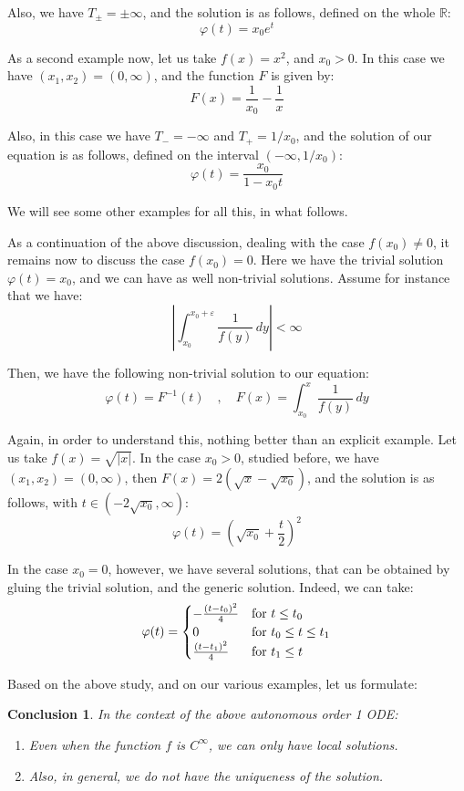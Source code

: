 \documentclass[12pt]{amsbook}
\newtheorem{conclusion}[theorem]{Conclusion}
\begin{document}
Also, we have $T_\pm=\pm\infty$, and the solution is as follows, defined on the whole $\mathbb R$:
$$\varphi(t)=x_0e^t$$

As a second example now, let us take $f(x)=x^2$, and $x_0>0$. In this case we have $(x_1,x_2)=(0,\infty)$, and the function $F$ is given by:
$$F(x)=\frac{1}{x_0}-\frac{1}{x}$$

Also, in this case we have $T_-=-\infty$ and $T_+=1/x_0$, and the solution of our equation is as follows, defined on the interval $(-\infty,1/x_0)$:
$$\varphi(t)=\frac{x_0}{1-x_0t}$$

We will see some other examples for all this, in what follows.

\bigskip

As a continuation of the above discussion, dealing with the case $f(x_0)\neq0$, it remains now to discuss the case $f(x_0)=0$. Here we have the trivial solution $\varphi(t)=x_0$, and we can have as well non-trivial solutions. Assume for instance that we have:
$$\left|\int_{x_0}^{x_0+\varepsilon}\frac{1}{f(y)}\,dy\right|<\infty$$

Then, we have the following non-trivial solution to our equation:
$$\varphi(t)=F^{-1}(t)\quad,\quad F(x)=\int_{x_0}^x\frac{1}{f(y)}\,dy$$

Again, in order to understand this, nothing better than an explicit example. Let us take $f(x)=\sqrt{|x|}$. In the case $x_0>0$, studied before, we have $(x_1,x_2)=(0,\infty)$, then $F(x)=2(\sqrt{x}-\sqrt{x_0})$, and the solution is as follows, with $t\in(-2\sqrt{x_0},\infty)$:
$$\varphi(t)=\left(\sqrt{x_0}+\frac{t}{2}\right)^2$$

In the case $x_0=0$, however, we have several solutions, that can be obtained by gluing the trivial solution, and the generic solution. Indeed, we can take:
$$\varphi(t)=\begin{cases}
-\frac{(t-t_0)^2}{4}&{\rm for}\ t\leq t_0\\
0&{\rm for}\ t_0\leq t\leq t_1\\
\frac{(t-t_1)^2}{4}&{\rm for}\ t_1\leq t
\end{cases}$$

Based on the above study, and on our various examples, let us formulate:

\begin{conclusion}
In the context of the above autonomous order 1 ODE:
\begin{enumerate}
\item Even when the function $f$ is $C^\infty$, we can only have local solutions.

\item Also, in general, we do not have the uniqueness of the solution. 
\end{enumerate}
\end{conclusion}
\end{document}
